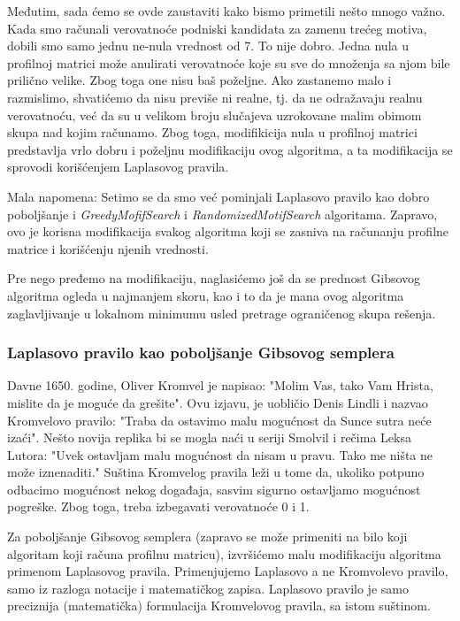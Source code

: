 Međutim, sada ćemo se ovde zaustaviti kako bismo primetili nešto mnogo važno. Kada smo računali verovatnoće podniski kandidata za zamenu trećeg motiva, dobili smo samo jednu ne-nula vrednost od 7. To nije dobro. Jedna nula u profilnoj matrici može anulirati verovatnoće koje su sve do množenja sa njom bile prilično velike. Zbog toga one nisu baš poželjne. Ako zastanemo malo i razmislimo, shvatićemo da nisu previše ni realne, tj. da ne odražavaju realnu verovatnoću, već da su u velikom broju slučajeva uzrokovane malim obimom skupa nad kojim računamo. Zbog toga, modifikicija nula u profilnoj matrici predstavlja vrlo dobru i poželjnu modifikaciju ovog algoritma, a ta modifikacija se sprovodi korišćenjem Laplasovog pravila.

Mala napomena: Setimo se da smo već pominjali Laplasovo pravilo kao dobro poboljšanje i \textit{GreedyMofifSearch} i \textit{RandomizedMotifSearch} algoritama. Zapravo, ovo je korisna modifikacija svakog algoritma koji se zasniva na računanju profilne matrice i korišćenju njenih vrednosti.

Pre nego pređemo na modifikaciju, naglasićemo još da se prednost Gibsovog algoritma ogleda u najmanjem skoru, kao i to da je mana ovog algoritma zaglavljivanje u lokalnom minimumu usled pretrage ograničenog skupa rešenja. 

\subsubsection{Laplasovo pravilo kao poboljšanje Gibsovog semplera}

Davne 1650. godine, Oliver Kromvel je napisao:
"Molim Vas, tako Vam Hrista, mislite da je moguće da grešite". 
Ovu izjavu, je uobličio Denis Lindli i nazvao Kromvelovo pravilo:
"Traba da ostavimo malu mogućnost da Sunce sutra neće izaći".
Nešto novija replika bi se mogla naći u seriji Smolvil i rečima Leksa Lutora: "Uvek ostavljam malu mogućnost da nisam u pravu. Tako me ništa ne može iznenaditi."
Suština Kromvelog pravila leži u tome da, ukoliko potpuno odbacimo mogućnost nekog događaja, sasvim sigurno ostavljamo mogućnost pogreške. Zbog toga, treba izbegavati verovatnoće 0 i 1.

Za poboljšanje Gibsovog semplera (zapravo se može primeniti na bilo koji algoritam koji računa profilnu matricu), izvršićemo malu modifikaciju algoritma primenom Laplasovog pravila. Primenjujemo Laplasovo a ne Kromvolevo pravilo, samo iz razloga notacije i matematičkog zapisa. Laplasovo pravilo je samo preciznija (matematička) formulacija Kromvelovog pravila, sa istom suštinom. 

